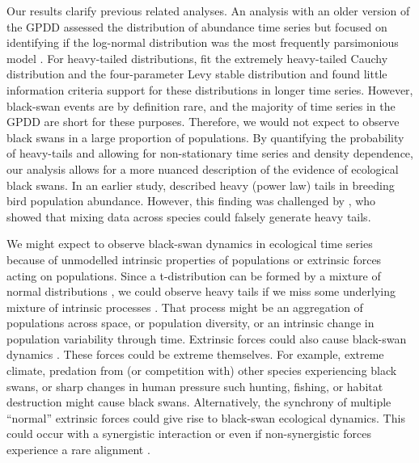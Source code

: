 Our results clarify previous related analyses. An analysis with an older
version of the GPDD assessed the distribution of abundance time series but
focused on identifying if the log-normal distribution was the most frequently
parsimonious model \citep{halley2002}. For heavy-tailed distributions,
\citet{halley2002} fit the extremely heavy-tailed Cauchy distribution and the
four-parameter Levy stable distribution and found little information criteria
support for these distributions in longer time series. However, black-swan
events are by definition rare, and the majority of time series in the GPDD are
short for these purposes. Therefore, we would not expect to observe black
swans in a large proportion of populations. By quantifying the probability of
heavy-tails and allowing for non-stationary time series and density
dependence, our analysis allows for a more nuanced description of the evidence
of ecological black swans. In an earlier study, \citet{keitt1998} described
heavy (power law) tails in breeding bird population abundance. However, this
finding was challenged by \citet{allen2001}, who showed that mixing data
across species could falsely generate heavy tails.

We might expect to observe black-swan dynamics in ecological time series
because of unmodelled intrinsic properties of populations or extrinsic forces
acting on populations. Since a t-distribution can be formed by a mixture of
normal distributions \citep[with the same mean and inverse-gamma-distributed
variances,][]{gelman2014}, we could observe heavy tails if we miss some
underlying mixture of intrinsic processes \citep{allen2001}. That process
might be an aggregation of populations across space, or population diversity,
or an intrinsic change in population variability through time. Extrinsic
forces could also cause black-swan dynamics \citep[e.g.][]{nunez2012}. These
forces could be extreme themselves. For example, extreme climate, predation
from (or competition with) other species experiencing black swans, or sharp
changes in human pressure such hunting, fishing, or habitat destruction might
cause black swans. Alternatively, the synchrony of multiple ``normal''
extrinsic forces could give rise to black-swan ecological dynamics. This could
occur with a synergistic interaction \citep[e.g.][]{kirby2009} or even if
non-synergistic forces experience a rare alignment \citep{denny2009}.

